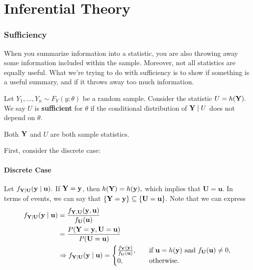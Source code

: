 \chapter{Inferential Theory}

\subsection{Sufficiency}
When you summarize information into a statistic, you are also throwing away some information included within the sample. Moreover, not all statistics are equally useful. What we're trying to do with sufficiency is to show if something is a useful summary, and if it throws away too much information.

\begin{definition}
Let $Y_1,\ldots, Y_n\sim F_Y(y;\theta)$ be a random sample. Consider the statistic $U=h(\mathbf Y).$ We say $U$ is \textbf{sufficient} for $\theta$ if the conditional distribution of $\mathbf Y \mid U$ does not depend on $\theta.$
\end{definition}
\begin{note}
Both $\mathbf Y$ and $U$ are both sample statistics. 
\end{note}

First, consider the discrete case:

\subsubsection{Discrete Case}

Let $f_{\mathbf Y\mid \mathbf U}(\mathbf y\mid \mathbf u).$ If $\mathbf Y=\mathbf y$, then $h(\mathbf Y)=h(\mathbf y),$ which implies that $\mathbf U=\mathbf u.$ In terms of events, we can say that $\{\mathbf Y=\mathbf y\}\subseteq\{\mathbf U=\mathbf u\}.$ Note that we can express
\begin{align*}
f_{\mathbf Y\mid \mathbf U}(\mathbf y\mid \mathbf u) &= \frac{f_{\mathbf Y,\mathbf U}(\mathbf y,\mathbf u)}{f_{\mathbf U}(\mathbf u)} \\
&=\frac{P(\mathbf Y=\mathbf y,\mathbf U=\mathbf u)}{P(\mathbf U=\mathbf u)}\\
&\Rightarrow f_{\mathbf Y\mid \mathbf U}(\mathbf y\mid \mathbf u)=\begin{cases}
\frac{f_{\mathbf Y}(\mathbf y)}{f_\mathbf U(\mathbf u)},\quad &\text{if } \mathbf u=h(\mathbf y) \text{ and } f_\mathbf U(\mathbf u)\neq 0, \\
0, \quad &\text{otherwise.}
\end{cases}
\end{align*}

